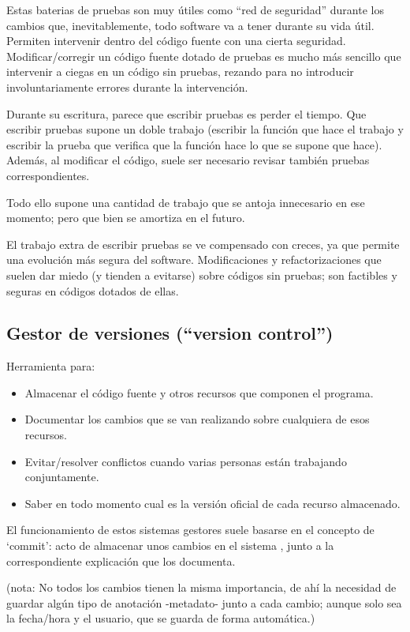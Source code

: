 \documentclass[spanish,12pt,a4paper,final,oneside]{book}
\begin{document}
Estas baterias de pruebas son muy útiles como ``red de seguridad'' durante los cambios que, inevitablemente, todo software va a tener durante su vida útil. Permiten intervenir dentro del código fuente con una cierta seguridad. Modificar/corregir un código fuente dotado de pruebas es mucho más sencillo que intervenir a ciegas en un código sin pruebas, rezando para no introducir involuntariamente errores durante la intervención.

Durante su escritura, parece que escribir pruebas es perder el tiempo. Que escribir pruebas supone un doble trabajo (escribir la función que hace el trabajo y escribir la prueba que verifica que la función hace lo que se supone que hace). Además, al modificar el código, suele ser necesario revisar también pruebas correspondientes. 

Todo ello supone una cantidad de trabajo que se antoja innecesario en ese momento; pero que bien se amortiza en el futuro.

El trabajo extra de escribir pruebas se ve compensado con creces, ya que permite una evolución más segura del software. Modificaciones y refactorizaciones que suelen dar miedo (y tienden a evitarse) sobre códigos sin pruebas; son factibles y seguras en códigos dotados de ellas.

\subsection{Gestor de versiones (``version control'')}
Herramienta para:
\begin{itemize}
\item Almacenar el código fuente y otros recursos que componen el programa.
\item Documentar los cambios que se van realizando sobre cualquiera de esos recursos.
\item Evitar/resolver conflictos cuando varias personas están trabajando conjuntamente.
\item Saber en todo momento cual es la versión oficial de cada recurso almacenado.
\end{itemize}

El funcionamiento de estos sistemas gestores suele basarse en el concepto de ‘commit’: acto de almacenar unos cambios en el sistema , junto a la correspondiente explicación que los documenta. 

(nota: No todos los cambios tienen la misma importancia, de ahí la necesidad de guardar algún tipo de anotación -metadato- junto a cada cambio; aunque solo sea la fecha/hora y el usuario, que se guarda de forma automática.)
\end{document}

